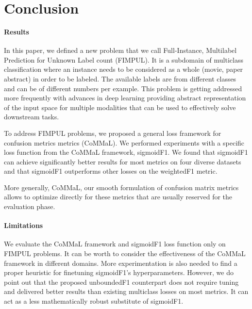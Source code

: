 
\section{Conclusion}
\label{sec:orged3d8a1}


\paragraph{Results}
In this paper, we defined a new problem that we call Full-Instance, Multilabel Prediction for Unknown Label count (FIMPUL). It is a subdomain of multiclass classification where an instance needs to be considered as a whole (movie, paper abstract) in order to be labeled. The available labels are from different classes and can be of different numbers per example. This problem is getting addressed more frequently with advances in deep learning providing abstract representation of the input space for multiple modalities that can be used to effectively solve downstream tasks. 

To address FIMPUL problems, we proposed a general loss framework for confusion metrics metrics (CoMMaL). We performed  experiments with a specific loss function from the CoMMaL framework, sigmoidF1. We found that sigmoidF1 can achieve significantly better results for most metrics on four diverse datasets and that sigmoidF1 outperforms other losses on the weightedF1 metric.

More generally, CoMMaL, our smooth formulation of confusion matrix metrics allows to optimize directly for these metrics that are usually reserved for the evaluation phase.

\paragraph{Limitations}
We evaluate the CoMMaL framework and sigmoidF1 loss function only on FIMPUL problems. It can be worth to consider the effectiveness of the CoMMaL framework in different domains. More experimentation is also needed to find a proper heuristic for finetuning sigmoidF1's hyperparameters. However, we do point out that the proposed unboundedF1 counterpart does not require tuning and delivered better results than existing multiclass losses on most metrics. It can act as a less mathematically robust substitute of sigmoidF1.

